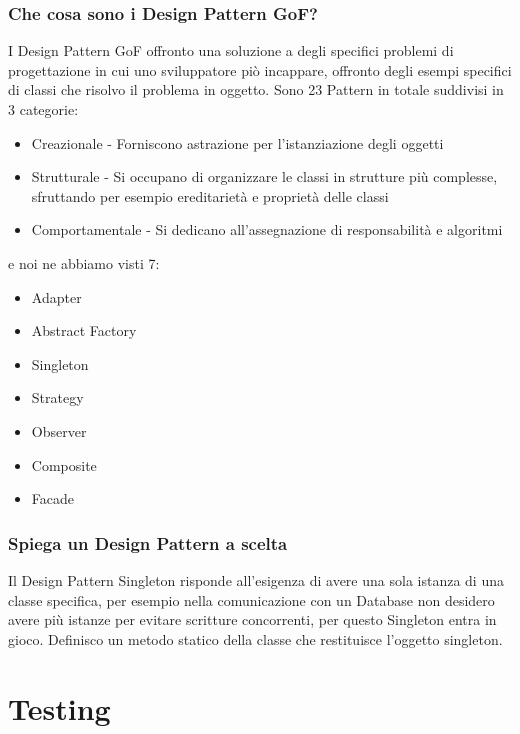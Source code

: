 \documentclass[12pt, a4paper, openany]{book}
\begin{document}
\subsection*{Che cosa sono i Design Pattern GoF?}
I Design Pattern GoF offronto una soluzione a degli specifici problemi di progettazione
in cui uno sviluppatore piò incappare, offronto degli esempi specifici di classi che risolvo
il problema in oggetto. Sono 23 Pattern in totale suddivisi in 3 categorie:
\begin{itemize}
    \item Creazionale - Forniscono astrazione per l'istanziazione degli oggetti
    \item Strutturale - Si occupano di organizzare le classi in strutture più complesse, sfruttando per
    esempio ereditarietà e proprietà delle classi
    \item Comportamentale - Si dedicano all'assegnazione di responsabilità e algoritmi
\end{itemize}
e noi ne abbiamo visti 7:
\begin{itemize}
    \item Adapter
    \item Abstract Factory
    \item Singleton
    \item Strategy
    \item Observer
    \item Composite
    \item Facade
\end{itemize}

\subsection*{Spiega un Design Pattern a scelta}
Il Design Pattern Singleton risponde all'esigenza di avere una sola istanza
di una classe specifica, per esempio nella comunicazione con un Database non desidero
avere più istanze per evitare scritture concorrenti, per questo Singleton entra in gioco.
Definisco un metodo statico della classe che restituisce l'oggetto singleton.\\

\chapter{Testing}
\end{document}
